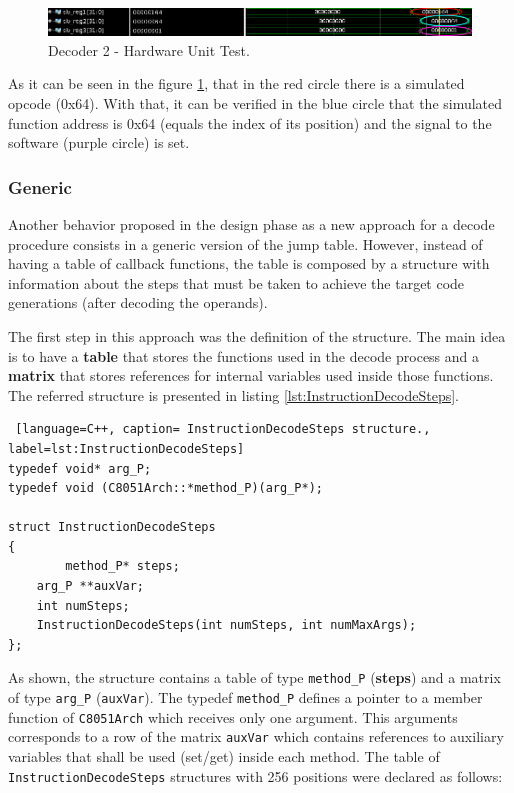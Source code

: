 \documentclass[12pt]{article}
\newcounter{subsubsubsection}[subsubsection]
\begin{document}
{\begin{figure}[H]
\centerline{
\includegraphics[scale=0.5]{images/test_bench}
}
\caption{Decoder 2 - Hardware Unit Test.}
\label{fig:test_bench} 
\end{figure}

As it can be seen in the figure \ref{fig:test_bench}, that in the red circle there is a simulated opcode (0x64). With that, it can be verified in the blue circle that the simulated function address is 0x64 (equals the index of its position) and the signal to the software (purple circle) is set. 
\subsubsection{Generic}

Another behavior proposed in the design phase as a new approach for a decode procedure consists in a generic version of the jump table. However, instead of having a table of callback functions, the table is composed by a structure with information about the steps that must be taken to achieve the target code generations (after decoding the operands).


The first step in this approach was the definition of the structure. The main idea is to have a \textbf{table} that stores the functions used in the decode process and a \textbf{matrix} that stores references for internal variables used inside those functions. The referred structure is presented in listing \ref{lst:InstructionDecodeSteps}.

\begin{lstlisting} [language=C++, caption= InstructionDecodeSteps structure., label=lst:InstructionDecodeSteps]
typedef void* arg_P;
typedef void (C8051Arch::*method_P)(arg_P*);

struct InstructionDecodeSteps 
{
		method_P* steps;
    arg_P **auxVar;
    int numSteps;
    InstructionDecodeSteps(int numSteps, int numMaxArgs);
};
\end{lstlisting}

As shown, the structure contains a table of type \texttt{method\_P} (\textbf{steps}) and a matrix of type \texttt{arg\_P} (\texttt{auxVar}). The typedef \texttt{method\_P} defines a pointer to a member function of \texttt{C8051Arch} which receives only one argument. This arguments corresponds to a row of the matrix \texttt{auxVar} which contains references to auxiliary variables that shall be used (set/get) inside each method. The table of \texttt{InstructionDecodeSteps} structures with 256 positions were declared as follows:

}
\end{document}
